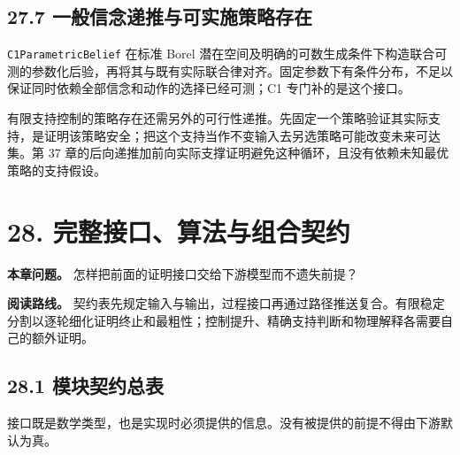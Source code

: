 \documentclass[
  11pt,
  oneside]{book}
\begin{document}
\section{27.7 一般信念递推与可实施策略存在}\label{ux4e00ux822cux4fe1ux5ff5ux9012ux63a8ux4e0eux53efux5b9eux65bdux7b56ux7565ux5b58ux5728}

\nolinkurl{C1ParametricBelief} 在标准 Borel 潜在空间及明确的可数生成条件下构造联合可测的参数化后验，再将其与既有实际联合律对齐。固定参数下有条件分布，不足以保证同时依赖全部信念和动作的选择已经可测；C1 专门补的是这个接口。

有限支持控制的策略存在还需另外的可行性递推。先固定一个策略验证其实际支持，是证明该策略安全；把这个支持当作不变输入去另选策略可能改变未来可达集。第 37 章的后向递推加前向实际支撑证明避免这种循环，且没有依赖未知最优策略的支持假设。

\chapter{28. 完整接口、算法与组合契约}\label{ch-28}

\textbf{本章问题。} 怎样把前面的证明接口交给下游模型而不遗失前提？

\textbf{阅读路线。} 契约表先规定输入与输出，过程接口再通过路径推送复合。有限稳定分割以逐轮细化证明终止和最粗性；控制提升、精确支持判断和物理解释各需要自己的额外证明。

\section{28.1 模块契约总表}\label{ux6a21ux5757ux5951ux7ea6ux603bux8868}

接口既是数学类型，也是实现时必须提供的信息。没有被提供的前提不得由下游默认为真。
\end{document}
